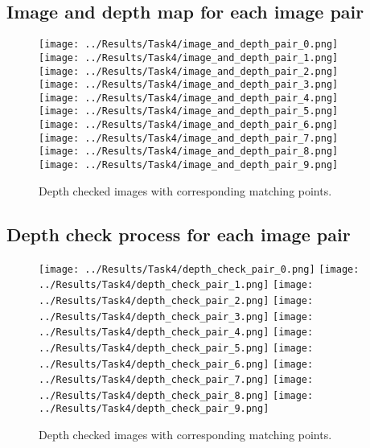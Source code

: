 \documentclass{article}
\begin{document}
\subsection{Image and depth map for each image pair}
\begin{figure}[H]
    \centering
    \texttt{[image: ../Results/Task4/image\_and\_depth\_pair\_0.png]}
    \texttt{[image: ../Results/Task4/image\_and\_depth\_pair\_1.png]}
    \texttt{[image: ../Results/Task4/image\_and\_depth\_pair\_2.png]}
    \texttt{[image: ../Results/Task4/image\_and\_depth\_pair\_3.png]}
    \texttt{[image: ../Results/Task4/image\_and\_depth\_pair\_4.png]}
    \texttt{[image: ../Results/Task4/image\_and\_depth\_pair\_5.png]}
    \texttt{[image: ../Results/Task4/image\_and\_depth\_pair\_6.png]}
    \texttt{[image: ../Results/Task4/image\_and\_depth\_pair\_7.png]}
    \texttt{[image: ../Results/Task4/image\_and\_depth\_pair\_8.png]}
    \texttt{[image: ../Results/Task4/image\_and\_depth\_pair\_9.png]}
    \caption{Depth checked images with corresponding matching points.}
\end{figure}

\subsection{Depth check process for each image pair}
\begin{figure}[H]
    \centering
    \texttt{[image: ../Results/Task4/depth\_check\_pair\_0.png]}
    \texttt{[image: ../Results/Task4/depth\_check\_pair\_1.png]}
    \texttt{[image: ../Results/Task4/depth\_check\_pair\_2.png]}
    \texttt{[image: ../Results/Task4/depth\_check\_pair\_3.png]}
    \texttt{[image: ../Results/Task4/depth\_check\_pair\_4.png]}
    \texttt{[image: ../Results/Task4/depth\_check\_pair\_5.png]}
    \texttt{[image: ../Results/Task4/depth\_check\_pair\_6.png]}
    \texttt{[image: ../Results/Task4/depth\_check\_pair\_7.png]}
    \texttt{[image: ../Results/Task4/depth\_check\_pair\_8.png]}
    \texttt{[image: ../Results/Task4/depth\_check\_pair\_9.png]}
    \caption{Depth checked images with corresponding matching points.}
\end{figure}
\end{document}
